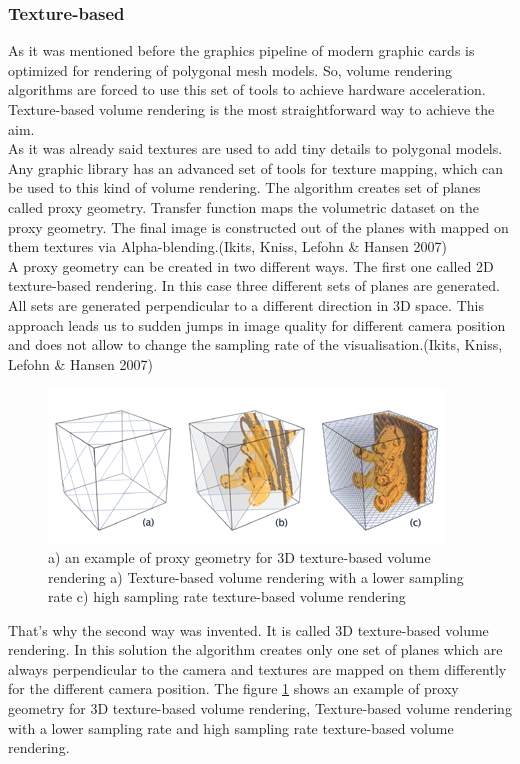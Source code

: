\documentclass[twoside, english, 11pt]{report}
\begin{document}
\subsubsection{Texture-based}

As it was mentioned before the graphics pipeline of modern graphic cards is optimized for rendering of polygonal mesh models. So, volume rendering algorithms are forced to use this set of tools to achieve hardware acceleration. Texture-based volume rendering is the most straightforward way to achieve the aim.\\

As it was already said textures are used to add tiny details to polygonal models. Any graphic library has an advanced set of tools for texture mapping, which can be used to this kind of volume rendering. The algorithm creates set of planes called proxy geometry. Transfer function maps the volumetric dataset on the proxy geometry. The final image is constructed out of the planes with mapped on them textures via Alpha-blending.(Ikits, Kniss, Lefohn \& Hansen 2007)\\

A proxy geometry can be created in two different ways. The first one called 2D texture-based rendering. In this case three different sets of planes are generated. All sets are generated perpendicular to a different direction in 3D space. This approach leads us to sudden jumps in image quality for different camera position and does not allow to change the sampling rate of the visualisation.(Ikits, Kniss, Lefohn \& Hansen 2007)\\
\begin{figure}[!h]
\centerline{
\includegraphics[scale=0.7]{img/texture-based}
}
\caption{a) an example of proxy geometry for 3D texture-based volume rendering a) Texture-based volume rendering with a lower sampling rate c) high sampling rate texture-based volume rendering\label{fig:text}}
\end{figure}
That's why the second way was invented. It is called 3D texture-based volume rendering. In this solution the algorithm creates only one set of planes which are always perpendicular to the camera and textures are mapped on them differently for the different camera position. The figure \ref{fig:text} shows an example of proxy geometry for 3D texture-based volume rendering, Texture-based volume rendering with a lower sampling rate and high sampling rate texture-based volume rendering.\\
\end{document}
